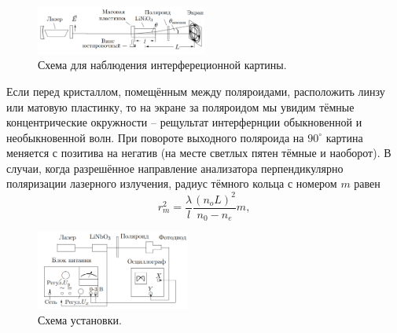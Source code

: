 \documentclass[a4paper,12pt]{article}
\begin{document}
\begin{figure}
\begin{center}
\includegraphics[width = 0.5\textwidth]{1.png}
\end{center}
\vspace{-20pt}
\caption{Схема для наблюдения интерфереционной картины.}
\end{figure}
Если перед кристаллом, помещённым между поляроидами, расположить линзу или матовую пластинку, то на экране за поляроидом мы увидим тёмные концентрические окружности -- рещультат интерфернции обыкновенной и необыкновенной волн. При повороте выходного поляроида на $90^\circ$ картина меняется с позитива на негатив (на месте светлых пятен тёмные и наоборот). В случаи, когда разрешённое направление анализатора перпендикулярно поляризации лазерного излучения, радиус тёмного кольца с номером $m$ равен
\begin{equation}
r_m^2 = \dfrac{\lambda}{l} \dfrac{(n_oL)^2}{n_0 - n_e}m,
\end{equation}

\begin{figure}
\begin{center}
\includegraphics[width = 0.45\textwidth]{2.png}
\end{center}
\vspace{-20pt}
\caption{Схема установки.}
\end{figure}
\end{document}

